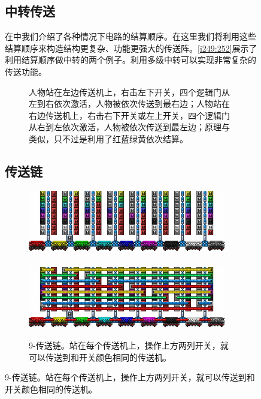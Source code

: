 \begin{figure}[!ht]
\subsection{中转传送}
在中我们介绍了各种情况下电路的结算顺序。在这里我们将利用这些结算顺序来构造结构更复杂、功能更强大的传送阵。\autoref{i249:252}展示了利用结算顺序做中转的两个例子。利用多级中转可以实现非常复杂的传送功能。

\begin{figure}[!ht]
\begin{center}
\qquad
{}
\end{center}
\caption{\protect{}人物站在左边传送机上，右击左下开关，四个逻辑门从左到右依次激活，人物被依次传送到最右边；人物站在右边传送机上，右击右下开关或左上开关，四个逻辑门从右到左依次激活，人物被依次传送到最左边；\protect{}原理与\protect{}类似，只不过是利用了红蓝绿黄依次结算。}
\label{i249:252}
\end{figure}

\subsection{传送链}

\begin{figure}[!ht]
\centering
\includegraphics[width=0.95\textwidth]{images/381.png}\\
\mbox{}\\
\includegraphics[width=0.95\textwidth]{images/382.png}
\caption{9-传送链。站在每个传送机上，操作上方两列开关，就可以传送到和开关颜色相同的传送机。}\label{fig20}
\end{figure}


\end{figure}
